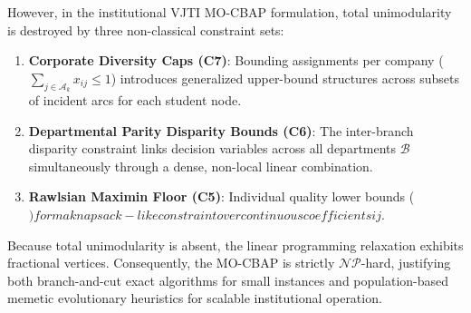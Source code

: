 However, in the institutional VJTI MO-CBAP formulation, total unimodularity is destroyed by three non-classical constraint sets:
\begin{enumerate}
    \item \textbf{Corporate Diversity Caps (C7)}: Bounding assignments per company ($\sum_{j \in \mathcal{A}_k} x_{ij} \le 1$) introduces generalized upper-bound structures across subsets of incident arcs for each student node.
    \item \textbf{Departmental Parity Disparity Bounds (C6)}: The inter-branch disparity constraint links decision variables across all departments $\mathcal{B}$ simultaneously through a dense, non-local linear combination.
    \item \textbf{Rawlsian Maximin Floor (C5)}: Individual quality lower bounds ( \ge \theta$) form a knapsack-like constraint over continuous coefficients {ij}$.
\end{enumerate}
Because total unimodularity is absent, the linear programming relaxation exhibits fractional vertices. Consequently, the MO-CBAP is strictly $\mathcal{NP}$-hard, justifying both branch-and-cut exact algorithms for small instances and population-based memetic evolutionary heuristics for scalable institutional operation.
